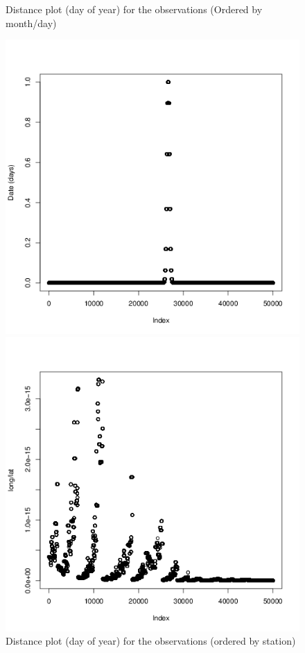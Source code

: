 \documentclass[a4paper, 12pt]{article}
\begin{document}
    \begin{figure}[H]
    \centering
        \begin{minipage}[]{0.4\textwidth}
            \caption{Distance plot (day of year) for the observations (Ordered by month/day)\label{fig:day}}
            \includegraphics[width=\textwidth]{share/1_date.png}
        \end{minipage}
        \begin{minipage}[]{0.4\textwidth}
            \caption{Distance plot (day of year) for the observations (ordered by station)\label{fig:dist}}
            \includegraphics[width=\textwidth]{share/1_dist.png}
        \end{minipage}
    \end{figure}
\end{document}
